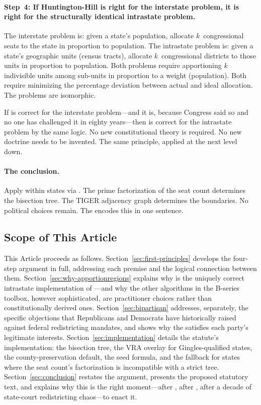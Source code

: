 \paragraph{Step~4: If Huntington-Hill is right for the interstate problem,
it is right for the structurally identical intrastate problem.}
The interstate problem is: given a state's population, allocate
$k$~congressional seats to the state in proportion to population.
The intrastate problem is: given a state's geographic units (census tracts),
allocate $k$~congressional districts to those units in proportion to population.
Both problems require apportioning $k$ indivisible units among sub-units
in proportion to a weight (population).
Both require minimizing the percentage deviation between actual and ideal
allocation.
The problems are isomorphic.

If \hh{} is correct for the interstate problem---and it is, because Congress
said so and no one has challenged it in eighty years---then \hh{} is correct
for the intrastate problem by the same logic.
No new constitutional theory is required.
No new doctrine needs to be invented.
The same principle, applied at the next level down.

\paragraph{The conclusion.}
Apply \hh{} within states via \ar{}.
The prime factorization of the seat count determines the bisection tree.
The TIGER adjacency graph determines the boundaries.
No political choices remain.
The \dia{} encodes this in one sentence.

\subsection{Scope of This Article}

This Article proceeds as follows.
Section~\ref{sec:first-principles} develops the four-step argument in full,
addressing each premise and the logical connection between them.
Section~\ref{sec:why-apportionregions} explains why \ar{} is the uniquely
correct intrastate implementation of \hh{}---and why the other algorithms
in the B-series toolbox, however sophisticated, are practitioner choices
rather than constitutionally derived ones.
Section~\ref{sec:bipartisan} addresses, separately, the specific objections
that Republicans and Democrats have historically raised against federal
redistricting mandates, and shows why the \dia{} satisfies each party's
legitimate interests.
Section~\ref{sec:implementation} details the statute's implementation:
the \hh{} bisection tree, the VRA overlay for Gingles-qualified states,
the county-preservation default, the seed formula, and the fallback for
states where the seat count's factorization is incompatible with a
strict \hh{} tree.
Section~\ref{sec:conclusion} restates the argument, presents the proposed
statutory text, and explains why this is the right moment---after \callais{},
after \rucho{}, after a decade of state-court redistricting chaos---to enact it.

